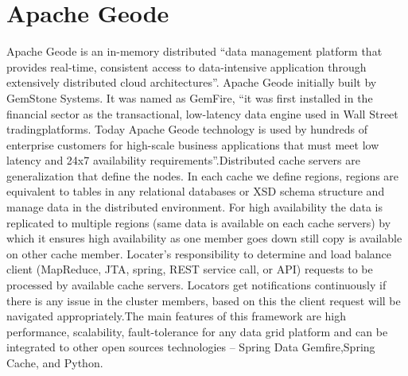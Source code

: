 \section{Apache Geode}

Apache Geode is an in-memory distributed “data management platform that provides real-time, consistent access to data-intensive application through extensively distributed cloud architectures”\cite{hid-sp18-514-apachegeodewiki}. Apache Geode initially built by GemStone Systems. It was named as GemFire, “it was first installed in the financial sector as the transactional, low-latency data engine used in Wall Street tradingplatforms. Today Apache Geode technology is used by hundreds of enterprise customers for high-scale business applications that must meet low latency and 24x7 availability requirements”\cite{hid-sp18-514-apachegeodewiki}.Distributed cache servers are generalization that define the nodes. In each cache we define regions, regions are equivalent to tables in any relational databases or XSD schema structure and manage data in the distributed environment. For high availability the data is replicated to multiple regions (same data is available on each cache servers) by which it ensures high availability as one member goes down still copy is available on other cache member. Locater’s responsibility to determine and load balance client (MapReduce, JTA, spring, REST service call, or API) requests to be processed by available cache servers. Locators get notifications continuously if there is any issue in the cluster members, based on this the client request will be navigated appropriately\cite{hid-sp18-514-apachegeodewiki}.The main features of this framework are high performance, scalability, fault-tolerance for any data grid platform and can be integrated to other open sources technologies – Spring Data Gemfire\cite{hid-sp18-514-geodespringgemfire},Spring Cache\cite{hid-sp18-514-geodespringcache}, and Python\cite{hid-sp18-514-geodepython}.


